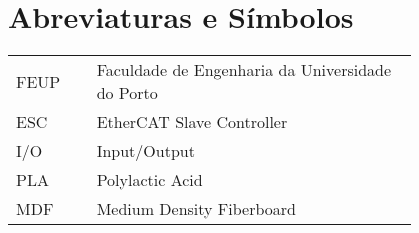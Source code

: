 \chapter*{Abreviaturas e Símbolos}

\begin{flushleft}
\begin{tabular}{l p{0.8\linewidth}}
FEUP     & Faculdade de Engenharia da Universidade do Porto\\
ESC      & EtherCAT Slave Controller\\
I/O      & Input/Output\\
PLA      & Polylactic Acid\\
MDF      & Medium Density Fiberboard\\
\end{tabular}
\end{flushleft}

